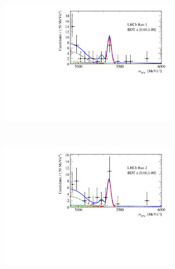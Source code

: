 {{\begin{figure}[tbp]
\begin{subfigure}[b]{0.48\textwidth}
        \includegraphics[width=\textwidth]{./Figs/BFAnalysis/Fig17d.pdf}
    \end{subfigure}
    ~ %
    \begin{subfigure}[b]{0.48\textwidth}
       \includegraphics[width=\textwidth]{./Figs/BFAnalysis/Fig17h.pdf}
    \end{subfigure}


\end{figure}}}
